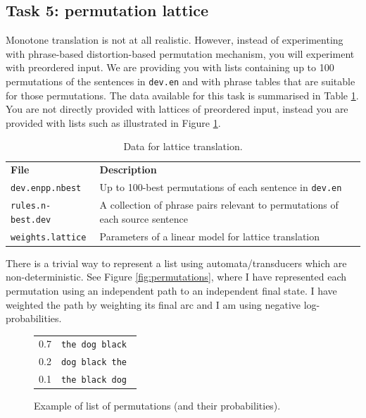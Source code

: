 \subsection{Task 5: permutation lattice}

Monotone translation is not at all realistic. 
However, instead of experimenting with phrase-based distortion-based permutation mechanism, you will experiment with preordered input.
We are providing you with lists containing up to 100 permutations of the sentences in \texttt{dev.en} and with phrase tables that are suitable for those permutations. 
The data available for this task is summarised in Table \ref{tab:data-preordered}.
You are not directly provided with lattices of preordered input, instead you are provided with lists such as illustrated in Figure \ref{fig:n-best}.


\begin{table}\centering
\begin{tabular}{l p{9cm} }
\textbf{File}   & \textbf{Description} \\
\texttt{dev.enpp.nbest} & Up to 100-best permutations of each sentence in \texttt{dev.en} \\
\texttt{rules.n-best.dev}  & A collection of phrase pairs relevant to permutations of each source sentence\\
\texttt{weights.lattice} & Parameters of a linear model for lattice translation \\
\end{tabular}
\caption{\label{tab:data-preordered}Data for lattice translation.}
\end{table}


There is a trivial way to represent a list using automata/transducers which are non-deterministic. See Figure \ref{fig:permutations}, where I have represented each permutation using an independent path to an independent final state. I have weighted the path by weighting its final arc and I am using negative log-probabilities.

\begin{figure}[h]\centering
\begin{tabular}{l l}
0.7 & \texttt{the dog black } \\
0.2 & \texttt{dog black the} \\
0.1 & \texttt{the black dog} \\
\end{tabular}
\caption{\label{fig:n-best}Example of list of permutations (and their probabilities).}
\end{figure}



